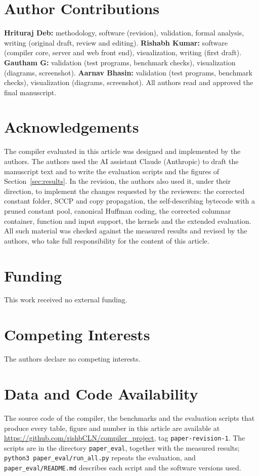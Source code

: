 \documentclass{ieeeaccess}
\begin{document}
\section*{Author Contributions}
\textbf{Hrituraj Deb:} methodology, software (revision), validation, formal analysis, writing (original draft, review and editing). \textbf{Rishabh Kumar:} software (compiler core, server and web front end), visualization, writing (first draft). \textbf{Gautham G:} validation (test programs, benchmark checks), visualization (diagrams, screenshot). \textbf{Aarnav Bhasin:} validation (test programs, benchmark checks), visualization (diagrams, screenshot). All authors read and approved the final manuscript.

\section*{Acknowledgements}
The compiler evaluated in this article was designed and implemented by the authors. The authors used the AI assistant Claude (Anthropic) to draft the manuscript text and to write the evaluation scripts and the figures of Section~\ref{sec:results}. In the revision, the authors also used it, under their direction, to implement the changes requested by the reviewers: the corrected constant folder, SCCP and copy propagation, the self-describing bytecode with a pruned constant pool, canonical Huffman coding, the corrected columnar container, function and input support, the kernels and the extended evaluation. All such material was checked against the measured results and revised by the authors, who take full responsibility for the content of this article.

\section*{Funding}
This work received no external funding.

\section*{Competing Interests}
The authors declare no competing interests.

\section*{Data and Code Availability}
The source code of the compiler, the benchmarks and the evaluation scripts that produce every table, figure and number in this article are available at \url{https://github.com/rishbCLN/compiler_project}, tag \texttt{paper-revision-1}. The scripts are in the directory \texttt{paper\_eval}, together with the measured results; \texttt{python3 paper\_eval/run\_all.py} repeats the evaluation, and \texttt{paper\_eval/README.md} describes each script and the software versions used.
\end{document}
